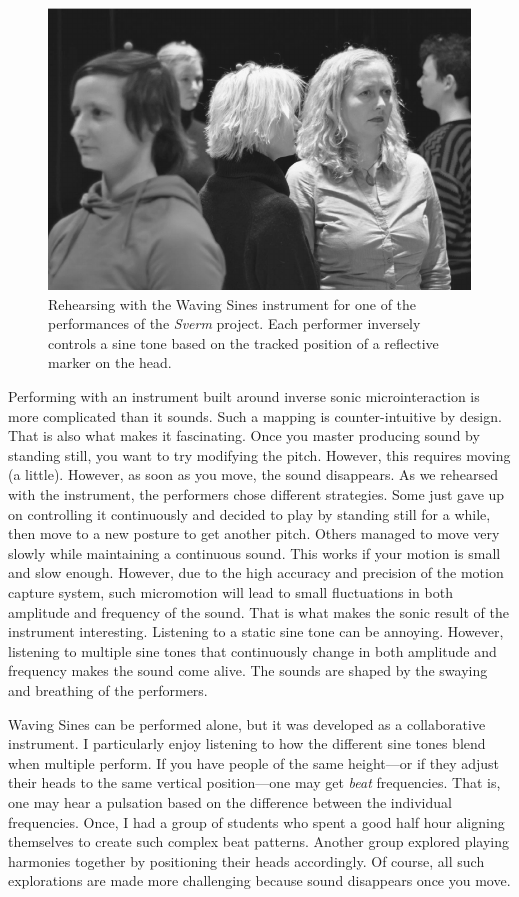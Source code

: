 \begin{figure}[tbp]
	\centering
		\includegraphics[width=1\columnwidth]{figures/76-waving-sines-crop.pdf}
	\caption{Rehearsing with the Waving Sines instrument for one of the performances of the \emph{Sverm}  project. Each performer inversely controls a sine tone based on the tracked position of a reflective marker on the head.}
	\label{fig:trial}
\end{figure}

Performing with an instrument built around inverse sonic microinteraction is more complicated than it sounds. Such a mapping is counter-intuitive by design. That is also what makes it fascinating. Once you master producing sound by standing still, you want to try modifying the pitch. However, this requires moving (a little). However, as soon as you move, the sound disappears. As we rehearsed with the instrument, the performers chose different strategies. Some just gave up on controlling it continuously and decided to play by standing still for a while, then move to a new posture to get another pitch. Others managed to move very slowly while maintaining a continuous sound. This works if your motion is small and slow enough. However, due to the high accuracy and precision of the motion capture system, such micromotion will lead to small fluctuations in both amplitude and frequency of the sound. That is what makes the sonic result of the instrument interesting. Listening to a static sine tone can be annoying. However, listening to multiple sine tones that continuously change in both amplitude and frequency makes the sound come alive. The sounds are shaped by the swaying and breathing of the performers.

Waving Sines can be performed alone, but it was developed as a collaborative instrument. I particularly enjoy listening to how the different sine tones blend when multiple perform. If you have people of the same height---or if they adjust their heads to the same vertical position---one may get \emph{beat} frequencies. That is, one may hear a pulsation based on the difference between the individual frequencies. Once, I had a group of students who spent a good half hour aligning themselves to create such complex beat patterns. Another group explored playing harmonies together by positioning their heads accordingly. Of course, all such explorations are made more challenging because sound disappears once you move.


